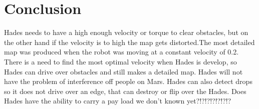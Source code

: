 \chapter{Conclusion}\label{ch:conclusion}

Hades needs to have a high enough velocity or torque to clear obstacles, but on the other hand if the velocity is to high the map gets distorted.The most detailed map was produced when the robot was moving at a constant velocity of 0.2. There is a need to find the most optimal velocity when Hades is develop, so Hades can drive over obstacles and still makes a detailed map. Hades will not have the problem of interference off people on Mars. Hades can also detect drops so it does not drive over an edge, that can destroy or flip over the Hades. Does Hades have the ability to carry a pay load we don't known yet?!?!?!?!?!?!?



